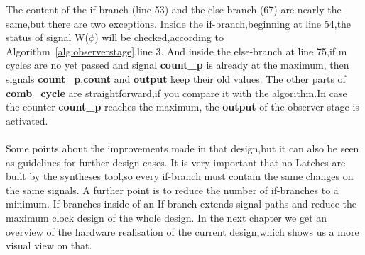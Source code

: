 The content of the if-branch (line 53) and the else-branch (67) are nearly the same,but there are two exceptions.
Inside the if-branch,beginning at line 54,the status of signal W($\phi$) will be checked,according to Algorithm~\ref{alg:observerstage},line 3.
And inside the else-branch at line 75,if m cycles are no yet passed and signal \textbf{count\_p} is already  at the maximum,
then signals \textbf{count\_p},\textbf{count} and \textbf{output} keep their old values.
The other parts of \textbf{comb\_cycle} are straightforward,if you compare it with the algorithm.In case the counter \textbf{count\_p} reaches the maximum,
the  \textbf{output} of the observer stage is activated. \\\\
Some points about the improvements made in that design,but it can also be seen as guidelines for further design cases.
It is very important that no Latches are built by the syntheses tool,so every if-branch must contain the same changes on the same signals.
A further point is to reduce the number of if-branches to a minimum. If-branches inside of an If branch extends signal paths and reduce the maximum clock design of the whole design.
In the next chapter we get an overview of the hardware realisation of the current design,which shows us a more visual view on that.
